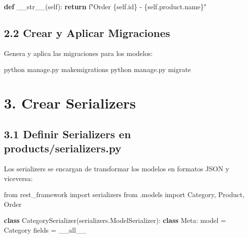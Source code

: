 \documentclass[
  a4paper,
  DIV=11,
  numbers=noendperiod,
  onepage,
  openany]{scrreprt}
\newenvironment{Shaded}{\begin{snugshade}}{\end{snugshade}}
\newcommand{\BuiltInTok}[1]{\textcolor[rgb]{0.00,0.23,0.31}{#1}}
\newcommand{\ControlFlowTok}[1]{\textcolor[rgb]{0.00,0.23,0.31}{\textbf{#1}}}
\newcommand{\ExtensionTok}[1]{\textcolor[rgb]{0.00,0.23,0.31}{#1}}
\newcommand{\FunctionTok}[1]{\textcolor[rgb]{0.28,0.35,0.67}{#1}}
\newcommand{\ImportTok}[1]{\textcolor[rgb]{0.00,0.46,0.62}{#1}}
\newcommand{\KeywordTok}[1]{\textcolor[rgb]{0.00,0.23,0.31}{\textbf{#1}}}
\newcommand{\NormalTok}[1]{\textcolor[rgb]{0.00,0.23,0.31}{#1}}
\newcommand{\OperatorTok}[1]{\textcolor[rgb]{0.37,0.37,0.37}{#1}}
\newcommand{\SpecialCharTok}[1]{\textcolor[rgb]{0.37,0.37,0.37}{#1}}
\newcommand{\SpecialStringTok}[1]{\textcolor[rgb]{0.13,0.47,0.30}{#1}}
\newcommand{\StringTok}[1]{\textcolor[rgb]{0.13,0.47,0.30}{#1}}
\newcommand{\VariableTok}[1]{\textcolor[rgb]{0.07,0.07,0.07}{#1}}
\begin{document}
\begin{tcolorbox}
\begin{Shaded}
\begin{Highlighting}[]
    \KeywordTok{def} \FunctionTok{\_\_str\_\_}\NormalTok{(}\VariableTok{self}\NormalTok{):}
        \ControlFlowTok{return} \SpecialStringTok{f"Order }\SpecialCharTok{\{}\VariableTok{self}\SpecialCharTok{.}\BuiltInTok{id}\SpecialCharTok{\}}\SpecialStringTok{ {-} }\SpecialCharTok{\{}\VariableTok{self}\SpecialCharTok{.}\NormalTok{product}\SpecialCharTok{.}\NormalTok{name}\SpecialCharTok{\}}\SpecialStringTok{"}
\end{Highlighting}
\end{Shaded}

\subsection{2.2 Crear y Aplicar
Migraciones}\label{crear-y-aplicar-migraciones}

Genera y aplica las migraciones para los modelos:

\begin{Shaded}
\begin{Highlighting}[]
\ExtensionTok{python}\NormalTok{ manage.py makemigrations}
\ExtensionTok{python}\NormalTok{ manage.py migrate}
\end{Highlighting}
\end{Shaded}

\section{3. Crear Serializers}\label{crear-serializers}

\subsection{3.1 Definir Serializers en
products/serializers.py}\label{definir-serializers-en-productsserializers.py}

Los serializers se encargan de transformar los modelos en formatos JSON
y viceversa:

\begin{Shaded}
\begin{Highlighting}[]
\ImportTok{from}\NormalTok{ rest\_framework }\ImportTok{import}\NormalTok{ serializers}
\ImportTok{from}\NormalTok{ .models }\ImportTok{import}\NormalTok{ Category, Product, Order}

\KeywordTok{class}\NormalTok{ CategorySerializer(serializers.ModelSerializer):}
    \KeywordTok{class}\NormalTok{ Meta:}
\NormalTok{        model }\OperatorTok{=}\NormalTok{ Category}
\NormalTok{        fields }\OperatorTok{=} \StringTok{\textquotesingle{}\_\_all\_\_\textquotesingle{}}


\end{Highlighting}
\end{Shaded}
\end{tcolorbox}
\end{document}
